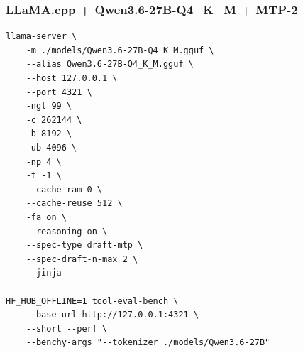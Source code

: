 \documentclass{article}
\begin{document}
\subsubsection{LLaMA.cpp + Qwen3.6-27B-Q4\_K\_M + MTP-2}
\begin{lstlisting}
llama-server \
    -m ./models/Qwen3.6-27B-Q4_K_M.gguf \
    --alias Qwen3.6-27B-Q4_K_M.gguf \
    --host 127.0.0.1 \
    --port 4321 \
    -ngl 99 \
    -c 262144 \
    -b 8192 \
    -ub 4096 \
    -np 4 \
    -t -1 \
    --cache-ram 0 \
    --cache-reuse 512 \
    -fa on \
    --reasoning on \
    --spec-type draft-mtp \
    --spec-draft-n-max 2 \
    --jinja

HF_HUB_OFFLINE=1 tool-eval-bench \
    --base-url http://127.0.0.1:4321 \
    --short --perf \
    --benchy-args "--tokenizer ./models/Qwen3.6-27B"
\end{lstlisting}
\end{document}
